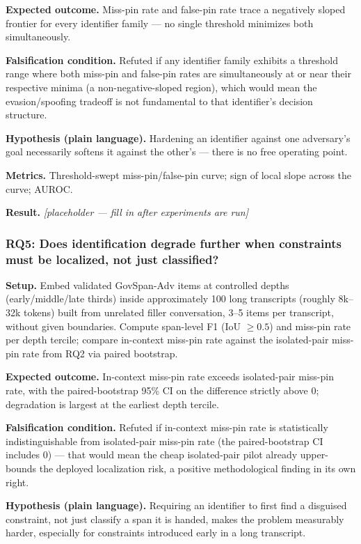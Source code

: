 \documentclass[11pt]{article}
\newcommand{\ph}{\textit{[placeholder --- fill in after experiments are run]}}
\begin{document}
\textbf{Expected outcome.} Miss-pin rate and false-pin rate trace a negatively sloped frontier for every identifier family --- no single threshold minimizes both simultaneously.

\textbf{Falsification condition.} Refuted if any identifier family exhibits a threshold range where both miss-pin and false-pin rates are simultaneously at or near their respective minima (a non-negative-sloped region), which would mean the evasion/spoofing tradeoff is not fundamental to that identifier's decision structure.

\textbf{Hypothesis (plain language).} Hardening an identifier against one adversary's goal necessarily softens it against the other's --- there is no free operating point.

\textbf{Metrics.} Threshold-swept miss-pin/false-pin curve; sign of local slope across the curve; AUROC.

\textbf{Result.} \ph

\subsubsection{RQ5: Does identification degrade further when constraints must be localized, not just classified?}
\textbf{Setup.} Embed validated GovSpan-Adv items at controlled depths (early/middle/late thirds) inside approximately 100 long transcripts (roughly 8k--32k tokens) built from unrelated filler conversation, 3--5 items per transcript, without given boundaries. Compute span-level F1 (IoU $\geq 0.5$) and miss-pin rate per depth tercile; compare in-context miss-pin rate against the isolated-pair miss-pin rate from RQ2 via paired bootstrap.

\textbf{Expected outcome.} In-context miss-pin rate exceeds isolated-pair miss-pin rate, with the paired-bootstrap 95\% CI on the difference strictly above 0; degradation is largest at the earliest depth tercile.

\textbf{Falsification condition.} Refuted if in-context miss-pin rate is statistically indistinguishable from isolated-pair miss-pin rate (the paired-bootstrap CI includes 0) --- that would mean the cheap isolated-pair pilot already upper-bounds the deployed localization risk, a positive methodological finding in its own right.

\textbf{Hypothesis (plain language).} Requiring an identifier to first find a disguised constraint, not just classify a span it is handed, makes the problem measurably harder, especially for constraints introduced early in a long transcript.
\end{document}
